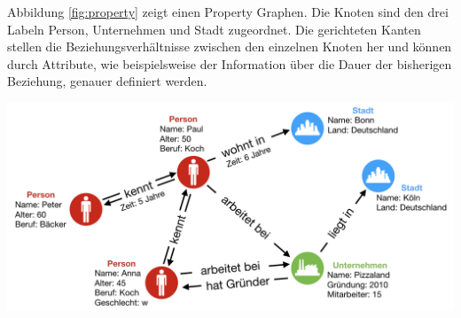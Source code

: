 Abbildung \ref{fig:property} zeigt einen Property Graphen.
Die Knoten sind den drei Labeln Person, Unternehmen und Stadt zugeordnet.
Die gerichteten Kanten stellen die Beziehungsverhältnisse zwischen den einzelnen Knoten her und können durch Attribute, wie beispielsweise der Information über die Dauer der bisherigen Beziehung, genauer definiert werden.
\begin{center}
	\includegraphics[scale = 0.65]{./images/Property_graph.png}
	\label{fig:property}
\end{center}

